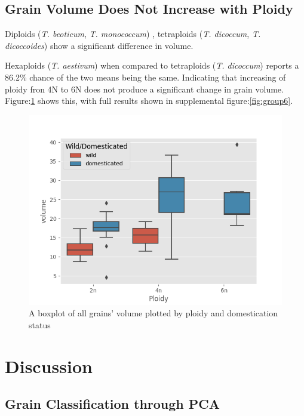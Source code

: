 \documentclass[11pt]{report}
\begin{document}
\clearpage


\section{Grain Volume Does Not Increase with Ploidy}
\label{sec:org040b291}

Diploids (\emph{T. beoticum}, \emph{T. monococcum}) , tetraploids (\emph{T. dicoccum}, \emph{T. dicoccoides})  show a significant difference in volume.

Hexaploids (\emph{T. aestivum}) when compared to tetraploids (\emph{T. dicoccum}) reports a 86.2\% chance of the two means being the same. Indicating that increasing of ploidy fron 4N to 6N does not produce a significant change in grain volume. Figure:\ref{fig:orgcc2921a} shows this, with full results shown in supplemental figure:\ref{fig:group6}.


\begin{figure}[htbp]
\centering
\includegraphics[width=14cm]{./images/results/ploidyvol.png}
\caption{\label{fig:orgcc2921a}
A boxplot of all grains' volume plotted by ploidy and domestication status}
\end{figure}

\clearpage
\chapter{Discussion}
\label{sec:orgfdb1f4b}

\section{Grain Classification through PCA}
\label{sec:orgbff3603}
\end{document}
